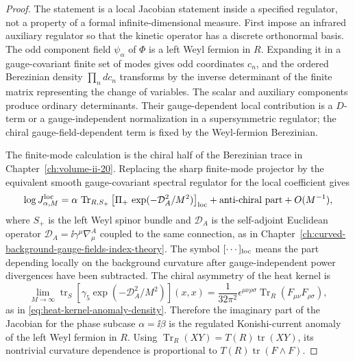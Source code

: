 \begin{proof}
The statement is a local Jacobian statement inside a specified regulator, not
a property of a formal infinite-dimensional measure.  First impose an
infrared auxiliary regulator so that the kinetic operator has a discrete
orthonormal basis.  The odd component field \(\psi_\alpha\) of \(\Phi\) is a
left Weyl fermion in \(R\).  Expanding it in a gauge-covariant finite set of
modes gives odd coordinates \(c_n\), and the ordered Berezinian density
\(\prod_n dc_n\) transforms by the inverse determinant of the finite matrix
representing the change of variables.  The scalar and auxiliary components
produce ordinary determinants.  Their gauge-dependent local contribution is
a \(D\)-term or a gauge-independent normalization in a supersymmetric
regulator; the chiral gauge-field-dependent term is fixed by the Weyl-fermion
Berezinian.

The finite-mode calculation is the chiral half of the Berezinian trace in
Chapter~\ref{ch:volume-ii-20}.  Replacing the sharp finite-mode projector by
the equivalent smooth gauge-covariant spectral regulator for the local
coefficient gives
\[
  \log J_{\alpha,M}^{\rm loc}
  =
  \alpha\,
  \operatorname{Tr}_{R,S_+}
  \left[
    \Pi_+\,\exp(-\mathcal D_A^2/M^2)
  \right]_{\rm loc}
  +\text{anti-chiral part}+O(M^{-1}),
\]
where \(S_+\) is the left Weyl spinor bundle and \(\mathcal D_A\) is the
self-adjoint Euclidean operator
\(\mathcal D_A=\ii\gamma^\mu\nabla_\mu^A\) coupled to the same connection, as
in Chapter~\ref{ch:curved-background-gauge-fields-index-theory}.  The symbol
\([\cdots]_{\rm loc}\) means the part depending locally on the background
curvature after gauge-independent power divergences have been subtracted.
The chiral asymmetry of the heat kernel is
\[
  \lim_{M\to\infty}
  \operatorname{tr}_{S}
  \left[
    \gamma_5\exp(-\mathcal D_A^2/M^2)
  \right](x,x)
  =
  \frac{1}{32\pi^2}
  \epsilon^{\mu\nu\rho\sigma}
  \operatorname{Tr}_{R}(F_{\mu\nu}F_{\rho\sigma}),
\]
as in
\eqref{eq:heat-kernel-anomaly-density}.  Therefore the imaginary part of the
Jacobian for the phase subcase \(\alpha=\ii\beta\) is the regulated
Konishi-current anomaly of the left Weyl fermion in \(R\).  Using
\(\operatorname{Tr}_{R}(XY)=T(R)\operatorname{tr}(XY)\), its nontrivial
curvature dependence is proportional to \(T(R)\operatorname{tr}(F\wedge F)\).


\end{proof}
